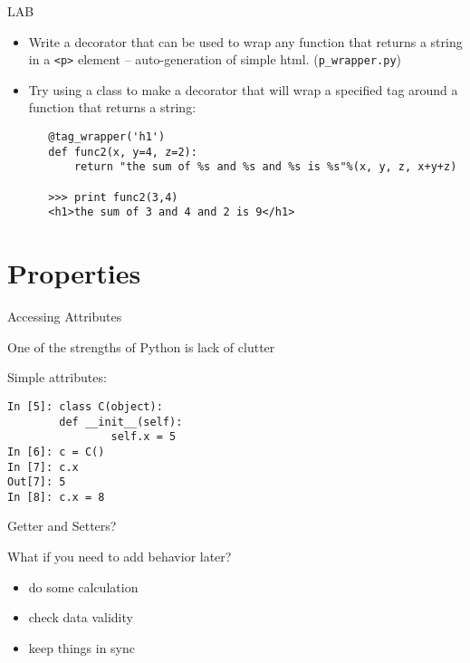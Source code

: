 \documentclass{beamer}
\begin{document}
\begin{frame}[fragile]{LAB}

\begin{itemize}
  \item Write a decorator that can be used to wrap any function that returns a string in a \verb|<p>| element -- auto-generation of simple html.
 (\verb|p_wrapper.py|)      

  \item Try using a class to make a decorator that will wrap a
   specified tag around a function that returns a string:
   \begin{verbatim}
   @tag_wrapper('h1')
   def func2(x, y=4, z=2):
       return "the sum of %s and %s and %s is %s"%(x, y, z, x+y+z)

   >>> print func2(3,4)
   <h1>the sum of 3 and 4 and 2 is 9</h1>
   \end{verbatim}
\end{itemize}

\end{frame}


\section{Properties}

\begin{frame}[fragile]{Accessing Attributes}

{\Large One of the strengths of Python is lack of clutter}

\vfill
{\Large Simple attributes:}

\begin{verbatim}
In [5]: class C(object):
        def __init__(self):
                self.x = 5
In [6]: c = C()
In [7]: c.x
Out[7]: 5
In [8]: c.x = 8
\end{verbatim}

\end{frame} 

\begin{frame}[fragile]{Getter and Setters?}

{\Large What if you need to add behavior later?}

\begin{itemize}
  \item do some calculation
  \item check data validity
  \item keep things in sync
\end{itemize}

\end{frame}
\end{document}
